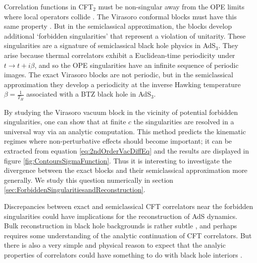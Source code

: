Correlation functions  in CFT$_2$ must be non-singular away from the OPE limits where local operators collide \cite{Maldacena:2015iua, Fitzpatrick:2016ive}.  The Virasoro conformal blocks must have this same property \cite{Fitzpatrick:2016mjq}.  But in the semiclassical approximation, the blocks develop additional `forbidden singularities' \cite{Fitzpatrick:2016ive} that represent a violation of unitarity.  These singularities are a signature of semiclassical black hole physics in AdS$_3$.  They arise because thermal correlators exhibit a Euclidean-time periodicity under $t \to t + i \beta$,  and so the OPE singularities have an infinite sequence of periodic images.  The exact Virasoro blocks  are not periodic, but in the semiclassical approximation they develop a periodicity at the inverse Hawking temperature $\beta = \frac{1}{T_H}$ associated with a BTZ black hole  in AdS$_3$.

By studying the Virasoro vacuum block in the vicinity of potential forbidden singularities, one can show that at finite $c$ the singularities are resolved in a universal way \cite{Fitzpatrick:2016ive} via an analytic computation.   This method predicts the kinematic regimes where non-perturbative effects should become important; it can be extracted from equation \ref{eq:2ndOrderVacDiffEq} and the results are displayed in figure \ref{fig:ContoursSigmaFunction}.  Thus it is interesting to investigate the divergence between the exact blocks and their semiclassical approximation more generally.  We study this question numerically in section \ref{sec:ForbiddenSingularitiesandReconstruction}. 

Discrepancies between exact and semiclassical CFT correlators near the forbidden singularities could have implications for the reconstruction of AdS dynamics.  Bulk reconstruction in black hole backgrounds is rather subtle \cite{Hamilton:2005ju, Bousso:2012mh, Leichenauer:2013kaa, Morrison:2014jha}, and perhaps requires some understanding of the analytic continuation of CFT correlators.  But  there is also a very simple and physical reason to expect that the analyic properties of correlators could have something to do with black hole interiors \cite{Hamilton:2005ju}.  

